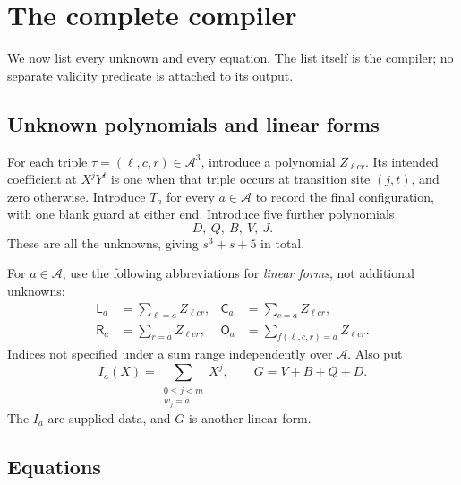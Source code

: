 \documentclass[11pt,letterpaper]{article}
\numberwithin{equation}{section}
\theoremstyle{definition}
\newcommand{\A}{\mathcal A}
\newcommand{\LL}{\mathsf L}
\newcommand{\CC}{\mathsf C}
\newcommand{\RR}{\mathsf R}
\newcommand{\OO}{\mathsf O}
\begin{document}
\section{The complete compiler}
\label{pwh:uh:sec:compiler}

We now list every unknown and every equation. The list itself is the
compiler; no separate validity predicate is attached to its output.

\subsection{Unknown polynomials and linear forms}

For each triple $\tau=(\ell,c,r)\in\A^3$, introduce a polynomial
$Z_{\ell c r}$. Its intended coefficient at $X^jY^t$ is one when that
triple occurs at transition site $(j,t)$, and zero otherwise. Introduce
$T_a$ for every $a\in\A$ to record the final configuration, with one blank
guard at either end. Introduce five further polynomials
\[
 D,\ Q,\ B,\ V,\ J.
\]
These are all the unknowns, giving $s^3+s+5$ in total.

For $a\in\A$, use the following abbreviations for \emph{linear forms},
not additional unknowns:
\begin{align}
 \LL_a&=\sum_{\ell=a}Z_{\ell c r}, &
 \CC_a&=\sum_{c=a}Z_{\ell c r},\label{pwh:uh:eq:marginals1}\\
 \RR_a&=\sum_{r=a}Z_{\ell c r}, &
 \OO_a&=\sum_{f(\ell,c,r)=a}Z_{\ell c r}.
 \label{pwh:uh:eq:marginals2}
\end{align}
Indices not specified under a sum range independently over $\A$.
Also put
\begin{equation}
 I_a(X)=\sum_{\substack{0\le j<m\\ w_j=a}}X^j,
 \qquad G=V+B+Q+D.
 \label{pwh:uh:eq:input-ghosts}
\end{equation}
The $I_a$ are supplied data, and $G$ is another linear form.

\subsection{Equations}
\end{document}
